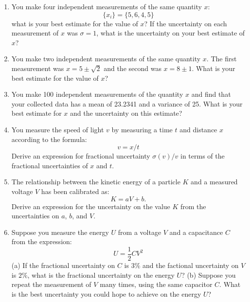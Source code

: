 \documentclass[12pt,oneside]{book}
\begin{document}
\begin{enumerate}

\item You make four independent measurements of the same quantity $x$:
\begin{displaymath}
\{ x_i \} = \{ 5,6,4,5\}
\end{displaymath}
what is your best estimate for the value of $x$?  If the uncertainty on each measurement of $x$ was $\sigma = 1$, what is the uncertainty on your best estimate of $x$?

\item You make two independent measurements of the same quantity $x$.  The first measurement was $x = 5 \pm \sqrt{2}$ and the second was $x = 8 \pm 1$.  What is your best estimate for the value of $x$?  

\item You make 100 independent measurements of the quantity $x$ and find that your collected data has a mean of 23.2341 and a variance of 25.  What is your best estimate for $x$ and the uncertainty on this estimate?

\item You measure the speed of light $v$ by measuring a time $t$ and distance $x$ according to the formula:
\begin{displaymath}
v = x / t
\end{displaymath}
Derive an expression for fractional uncertainty $\sigma(v)/v$ in terms of the fractional uncertainties of $x$ and $t$.

\item The relationship between the kinetic energy of a particle $K$ and a measured voltage $V$ has been calibrated as:
\begin{displaymath}
K = a V + b.
\end{displaymath}
Derive an expression for the uncertainty on the value $K$ from the uncertainties on $a$, $b$, and $V$.

\item Suppose you measure the energy $U$ from a voltage $V$ and a capacitance $C$ from the expression:
\begin{displaymath}
U = \frac{1}{2} C V^2
\end{displaymath}
(a) If the fractional uncertainty on $C$ is $3\%$ and the factional uncertainty on $V$ is $2\%$, what is the fractional uncertainty on the energy $U$?  (b) Suppose you repeat the measurement of $V$ many times, using the same capacitor $C$.   What is the best uncertainty you could hope to achieve on the energy $U$?


\end{enumerate}
\end{document}
